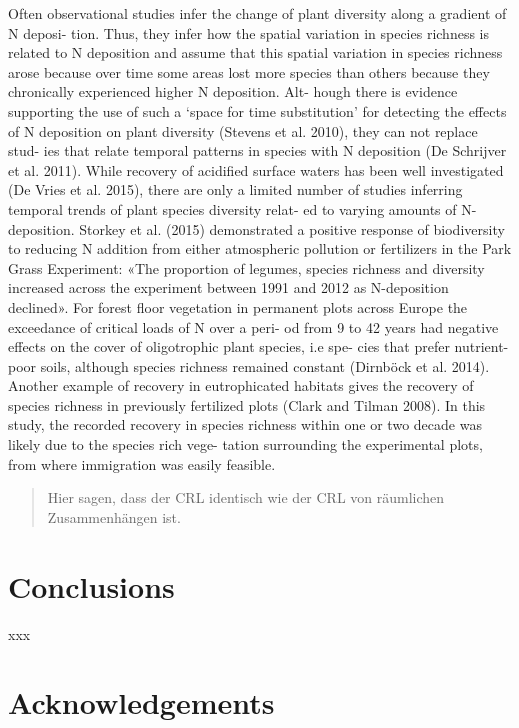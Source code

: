 \documentclass[fleqn,10pt,lineno]{wlpeerj} %
\theoremstyle{definition}
\theoremstyle{definition}
\theoremstyle{definition}
\theoremstyle{remark}
\begin{document}
Often observational studies infer the change of plant diversity along a
gradient of N deposi- tion. Thus, they infer how the spatial variation
in species richness is related to N deposition and assume that this
spatial variation in species richness arose because over time some areas
lost more species than others because they chronically experienced
higher N deposition. Alt- hough there is evidence supporting the use of
such a `space for time substitution' for detecting the effects of N
deposition on plant diversity (Stevens et al. 2010), they can not
replace stud- ies that relate temporal patterns in species with N
deposition (De Schrijver et al. 2011). While recovery of acidified
surface waters has been well investigated (De Vries et al. 2015), there
are only a limited number of studies inferring temporal trends of plant
species diversity relat- ed to varying amounts of N-deposition. Storkey
et al. (2015) demonstrated a positive response of biodiversity to
reducing N addition from either atmospheric pollution or fertilizers in
the Park Grass Experiment: «The proportion of legumes, species richness
and diversity increased across the experiment between 1991 and 2012 as
N-deposition declined». For forest floor vegetation in permanent plots
across Europe the exceedance of critical loads of N over a peri- od from
9 to 42 years had negative effects on the cover of oligotrophic plant
species, i.e spe- cies that prefer nutrient-poor soils, although species
richness remained constant (Dirnböck et al. 2014). Another example of
recovery in eutrophicated habitats gives the recovery of species
richness in previously fertilized plots (Clark and Tilman 2008). In this
study, the recorded recovery in species richness within one or two
decade was likely due to the species rich vege- tation surrounding the
experimental plots, from where immigration was easily feasible.

\begin{quote}
Hier sagen, dass der CRL identisch wie der CRL von räumlichen
Zusammenhängen ist.
\end{quote}

\section*{Conclusions}\label{conclusions}

xxx

\section*{Acknowledgements}\label{acknowledgements}
\end{document}
